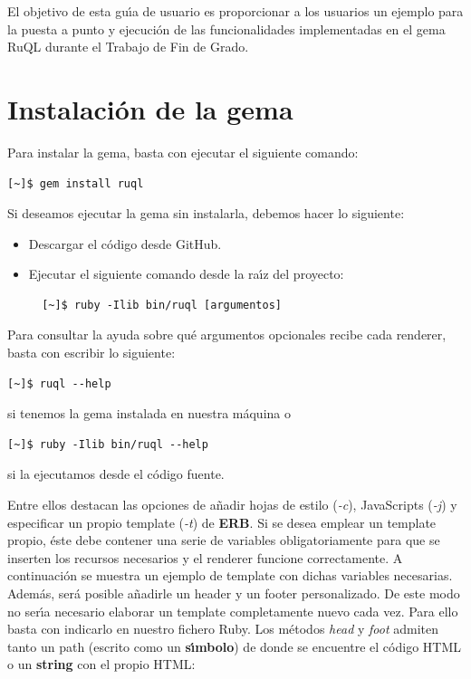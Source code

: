 El objetivo de esta gu\'{\i}a de usuario es proporcionar a los usuarios un ejemplo para la puesta a punto y ejecuci\'on de las 
funcionalidades implementadas en el gema RuQL durante el Trabajo de Fin de Grado.

\section{Instalaci\'on de la gema}
\label{Apendice2:instalacion}

Para instalar la gema, basta con ejecutar el siguiente comando:
\begin{verbatim}
[~]$ gem install ruql
\end{verbatim}

Si deseamos ejecutar la gema sin instalarla, debemos hacer lo siguiente:
\begin{itemize}
  \item Descargar el c\'odigo desde GitHub.
  \item Ejecutar el siguiente comando desde la ra\'{\i}z del proyecto:
  \begin{verbatim}
  [~]$ ruby -Ilib bin/ruql [argumentos]
  \end{verbatim}
\end{itemize}

Para consultar la ayuda sobre qu\'e argumentos opcionales recibe cada renderer, basta con escribir lo siguiente:
\begin{verbatim}
[~]$ ruql --help
\end{verbatim}
si tenemos la gema instalada en nuestra m\'aquina o
\begin{verbatim}
[~]$ ruby -Ilib bin/ruql --help
\end{verbatim}
si la ejecutamos desde el c\'odigo fuente.

Entre ellos destacan las opciones de a\~{n}adir hojas de estilo (\textit{-c}), JavaScripts (\textit{-j}) y especificar un propio template (\textit{-t}) de {\bfseries ERB}.
Si se desea emplear un template propio, \'este debe contener una serie de variables obligatoriamente para que se inserten los recursos necesarios y el renderer funcione
correctamente. A continuaci\'on se muestra un ejemplo de template con dichas variables necesarias. Adem\'as, ser\'a posible a\~{n}adirle un header y un footer personalizado. 
De este modo no ser\'{\i}a necesario elaborar un template completamente nuevo cada vez. Para ello basta con indicarlo en nuestro fichero Ruby. Los m\'etodos \textit{head} y
\textit{foot} admiten tanto un path (escrito como un {\bfseries s\'{\i}mbolo}) de donde se encuentre el c\'odigo HTML o un {\bfseries string} con el propio HTML:

